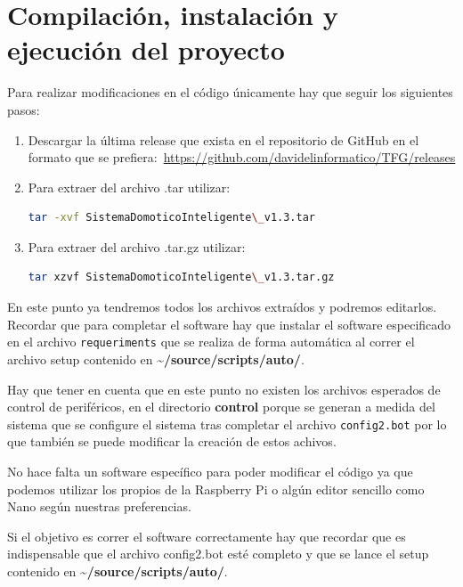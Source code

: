 \section{Compilación, instalación y ejecución del proyecto}
Para realizar modificaciones en el código únicamente hay que seguir los siguientes pasos:
\begin{enumerate}
    \item Descargar la última release que exista en el repositorio de GitHub en el formato que se prefiera:~\url{https://github.com/davidelinformatico/TFG/releases}
    \item Para extraer del archivo .tar utilizar: 
    \begin{lstlisting}[language=sh, firstnumber=0, basicstyle=\normalsize, caption={Comando para extraer archivos .tar.}] 
tar -xvf SistemaDomoticoInteligente\_v1.3.tar \end{lstlisting}
        
    \item Para extraer del archivo .tar.gz utilizar:
    \begin{lstlisting}[language=sh, firstnumber=0, basicstyle=\normalsize, caption={Comando para extraer archivos .tar.gz}] 
tar xzvf SistemaDomoticoInteligente\_v1.3.tar.gz \end{lstlisting}
\end{enumerate}
En este punto ya tendremos todos los archivos extraídos y podremos editarlos. Recordar que para completar el software hay que instalar el software especificado en el archivo \texttt{requeriments} que se realiza de forma automática al correr el archivo setup contenido en \textbf{\textasciitilde/source/scripts/auto/}. 

Hay que tener en cuenta que en este punto no existen los archivos esperados de control de periféricos, en el directorio \textbf{control} porque se generan a medida del sistema que se configure el sistema tras completar el archivo \texttt{config2.bot} por lo que también se puede modificar la creación de estos achivos.

No hace falta un software específico para poder modificar el código ya que podemos utilizar los propios de la Raspberry Pi o algún editor sencillo como Nano según nuestras preferencias.

Si el objetivo es correr el software correctamente hay que recordar que es indispensable que el archivo config2.bot esté completo y que se lance el setup contenido en \textbf{\textasciitilde/source/scripts/auto/}.

